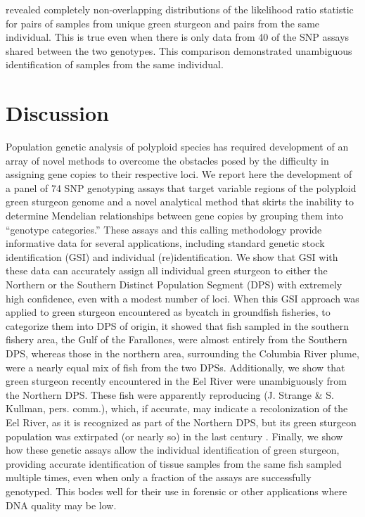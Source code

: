 revealed completely non-overlapping distributions of the likelihood ratio
statistic for pairs of samples from unique green sturgeon and pairs from the same
individual. This is true even when there is only data from 40 
of the SNP assays shared between the two genotypes.
This comparison
demonstrated unambiguous identification of samples from the same individual.




\section{Discussion}


Population genetic analysis of polyploid species has required development of an array of novel 
methods to overcome the obstacles posed by the difficulty in assigning gene copies to their 
respective loci. We report here the development of a panel of 74 SNP genotyping assays that 
target variable regions of the polyploid green sturgeon genome and a novel analytical method 
that skirts the inability to determine Mendelian relationships between gene copies by grouping 
them into ``genotype categories.'' These assays and this calling methodology provide informative 
data for several applications, including standard genetic stock identification (GSI) and 
individual (re)identification. We show that GSI with these data can accurately assign all 
individual green sturgeon to either the Northern or the Southern Distinct Population Segment (DPS) 
with extremely high confidence, even with a modest number of loci. When this GSI approach 
was applied to green sturgeon encountered as bycatch in groundfish fisheries, to categorize 
them into DPS of origin, it showed that fish sampled in the southern fishery area, the 
Gulf of the Farallones, were almost entirely from the Southern DPS, whereas those in the 
northern area, surrounding the Columbia River plume, were a nearly equal mix of fish from 
the two DPSs. Additionally, we show that green sturgeon recently encountered in the Eel River
were unambiguously 
from the Northern DPS. These fish were apparently reproducing (J. Strange \& S. Kullman, pers. comm.), 
which, if accurate, may indicate a recolonization of the Eel River, as it is recognized as
part of the Northern DPS, but its green sturgeon population was extirpated (or nearly so) in the last century \citep{adams2007population}. 
Finally, we show how these 
genetic assays allow the individual identification of green sturgeon, providing accurate 
identification of tissue samples from the same fish sampled multiple times, even when 
only a fraction of the assays are successfully genotyped. This bodes well for their 
use in forensic or other applications where DNA quality may be low. 



